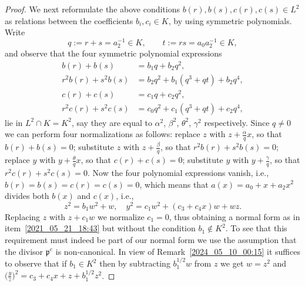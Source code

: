 \documentclass[12pt,reqno]{amsart}
\newcommand{\toda}[2][]{\todo[color=blue!30, #1]{#2}} %
\theoremstyle{definition}
\newcommand{\pp}{\mathfrak{p}}
\newcommand{\al}{\alpha}
\newcommand{\be}{\beta}
\newcommand{\te}{\theta}
\newcommand{\ga}{\gamma}
\begin{document}
\begin{proof}
We next reformulate the above conditions $b(r),b(s),c(r),c(s) \in L^2$ as relations between the coefficients $b_i,c_i \in K$, by using symmetric polynomials.
Write
\[ q := r + s = a_2^{-1} \in K, \qquad t := rs = a_0 a_2^{-1} \in K, \]
and observe that the four symmetric polynomial expressions
\begin{align*}
	b(r) + b(s) &= b_1 q + b_2 q^2, \\
	r^2 b(r) + s^2 b(s) &= b_2 q^2 + b_1(q^3 + qt) + b_2 q^4, \\
	c(r) + c(s) &= c_1 q + c_2 q^2, \\
	r^2 c(r) + s^2 c(s) &= c_0 q^2 + c_1(q^3 + qt) + c_2 q^4,
\end{align*}
lie in $L^2 \cap K = K^2$, say they are equal to $\al^2$, $\be^2$, $\te^2$, $\ga^2$ respectively. Since $q \neq 0$ we can perform four normalizations as follows: 
replace $z$ with $z + \frac\al q x$, so that $b(r) + b(s) = 0$; 
substitute $z$ with $z + \frac\be q$, so that $r^2 b(r) + s^2 b(s) = 0$; 
replace $y$ with $y + \frac\te q x$, so that $c(r) + c(s) = 0$; 
substitute $y$ with $y + \frac\ga q$, so that $r^2 c(r) + s^2 c(s) = 0$. 
Now the four polynomial expressions vanish, 
i.e., $b(r) = b(s) = c(r) = c(s) = 0$, which means that $a(x)= a_0 + x + a_2 x^2$ divides both $b(x)$ and $c(x)$,
i.e.,
\[ z^2 = b_1 w^2 + w, \quad y^2 = c_1 w^2 + (c_3 + c_4 x) w + w z. \]
Replacing $z$ with $z + c_1 w$ we normalize $c_1 = 0$, thus obtaining a normal form as in item~\ref{2021_05_21_18:43} but without the condition $b_1 \notin K^2$.
To see that this requirement must indeed be part of our normal form we use the assumption that the divisor $\pp^e$ is non-canonical.
In view of Remark~\ref{2024_05_10_00:15} it suffices to observe that if $b_1\in K^2$ then by subtracting $b_1^{1/2} w$ from $z$ we get $w=z^2$ and $\big(\frac{y}{z}\big)^2 = c_3 + c_4 x + z + b_1^{1/2} z^2$.


\end{proof}
\end{document}

